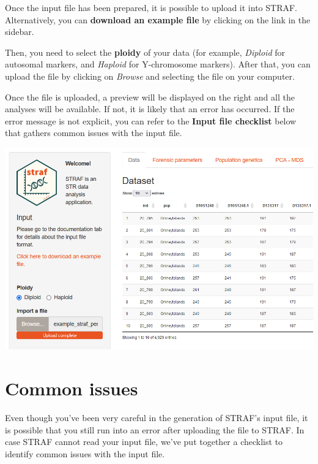 \documentclass[
]{book}
\begin{document}
Once the input file has been prepared, it is possible to upload it into STRAF. Alternatively,
you can \textbf{download an example file} by clicking on the link in the sidebar.

Then, you need to select the \textbf{ploidy} of your data (for example, \emph{Diploid} for
autosomal markers, and \emph{Haploid} for Y-chromosome markers). After that, you can
upload the file by clicking on \emph{Browse} and selecting the file on your computer.

Once the file is uploaded, a preview will be displayed on the right and all the
analyses will be available. If not, it is likely that an error has occurred. If the error
message is not explicit, you can refer to the \textbf{Input file checklist} below that
gathers common issues with the input file.

\includegraphics[width=1\linewidth]{img/capture_import_1}

\hypertarget{common-issues}{%
\section{Common issues}\label{common-issues}}

Even though you've been very careful in the generation of STRAF's input file,
it is possible that you still run into an error after uploading the file to STRAF.
In case STRAF cannot read your input file, we've put together a checklist to identify
common issues with the input file.
\end{document}
